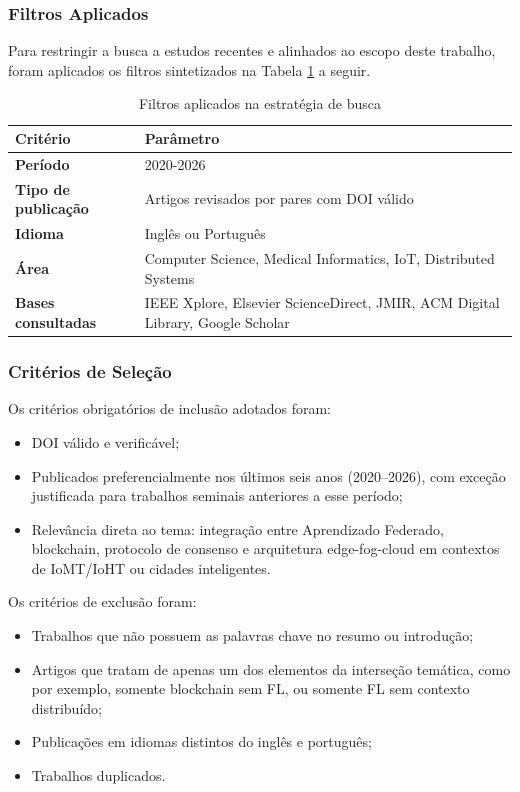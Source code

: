 \documentclass[12pt]{article}
\begin{document}
\subsubsection{Filtros Aplicados}

Para restringir a busca a estudos recentes e alinhados ao escopo deste trabalho, foram aplicados os filtros sintetizados na Tabela \ref{tab:filtros_busca} a seguir.

\begin{table}[!htbp]
\centering
\caption{Filtros aplicados na estratégia de busca}
\label{tab:filtros_busca}
\begin{tabular}{p{4cm}p{10cm}}
\toprule
\textbf{Critério} & \textbf{Parâmetro} \\
\midrule
\textbf{Período} & 2020-2026 \\
\midrule
\textbf{Tipo de publicação} & Artigos revisados por pares com DOI válido \\
\midrule
\textbf{Idioma} & Inglês ou Português \\
\midrule
\textbf{Área} & Computer Science, Medical Informatics, IoT, Distributed Systems \\
\midrule
\textbf{Bases consultadas} & IEEE Xplore, Elsevier ScienceDirect, JMIR, ACM Digital Library, Google Scholar \\
\bottomrule
\end{tabular}
\end{table}

\subsubsection{Critérios de Seleção}

Os critérios obrigatórios de inclusão adotados foram:

\begin{itemize}
    \item DOI válido e verificável;
    \item Publicados preferencialmente nos últimos seis anos (2020--2026), com exceção justificada para trabalhos seminais anteriores a esse período;
    \item Relevância direta ao tema: integração entre Aprendizado Federado, blockchain, protocolo de consenso e arquitetura edge-fog-cloud em contextos de IoMT/IoHT ou cidades inteligentes.
\end{itemize}

Os critérios de exclusão foram:

\begin{itemize}
    \item Trabalhos que não possuem as palavras chave no resumo ou introdução;
    \item Artigos que tratam de apenas um dos elementos da interseção temática, como por exemplo, somente blockchain sem FL, ou somente FL sem contexto distribuído;
    \item Publicações em idiomas distintos do inglês e português;
    \item Trabalhos duplicados.
\end{itemize}
\end{document}
